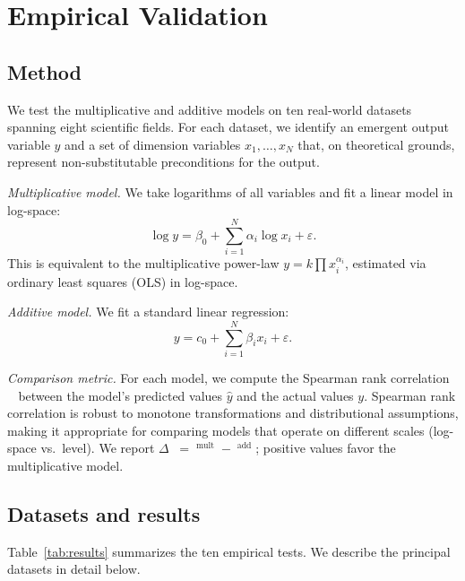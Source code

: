 \documentclass[12pt, a4paper]{article}
\theoremstyle{definition}
\theoremstyle{remark}
\DeclareMathOperator{\Spearman}{\rho_s}
\begin{document}
\section{Empirical Validation}\label{sec:empirical}

\subsection{Method}\label{sec:method}

We test the multiplicative and additive models on ten real-world datasets spanning eight scientific fields. For each dataset, we identify an emergent output variable $y$ and a set of dimension variables $x_1, \ldots, x_N$ that, on theoretical grounds, represent non-substitutable preconditions for the output.

\textit{Multiplicative model.} We take logarithms of all variables and fit a linear model in log-space:
\begin{equation}\label{eq:logmodel}
\log y = \beta_0 + \sum_{i=1}^{N} \alpha_i \log x_i + \varepsilon.
\end{equation}
This is equivalent to the multiplicative power-law $y = k \prod x_i^{\alpha_i}$, estimated via ordinary least squares (OLS) in log-space.

\textit{Additive model.} We fit a standard linear regression:
\begin{equation}\label{eq:linmodel}
y = c_0 + \sum_{i=1}^{N} \beta_i x_i + \varepsilon.
\end{equation}

\textit{Comparison metric.} For each model, we compute the Spearman rank correlation $\Spearman$ between the model's predicted values $\hat{y}$ and the actual values $y$. Spearman rank correlation is robust to monotone transformations and distributional assumptions, making it appropriate for comparing models that operate on different scales (log-space vs.\ level). We report $\Delta\Spearman = \Spearman^{\text{mult}} - \Spearman^{\text{add}}$; positive values favor the multiplicative model.

\subsection{Datasets and results}

Table~\ref{tab:results} summarizes the ten empirical tests. We describe the principal datasets in detail below.
\end{document}
